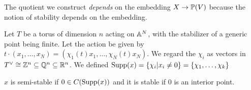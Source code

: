 
\begin{remark}
 The quotient we construct \emph{depends} on the embedding $X\to \PP(V)$ because the notion of stability depends on the embedding.
\end{remark}

\begin{proposition}
 Let $T$ be a torus of dimension $n$ acting on $\AA^N$, with the stabilizer of a generic point being finite. Let the action be given by $t\cdot (x_1,\dots, x_N)=(\chi_1(t)x_1,\dots, \chi_N(t)x_N)$. We regard the $\chi_i$ as vectors in $T^\vee\cong \ZZ^n\subseteq \QQ^n\subseteq \RR^n$. We defined $\supp(x)=\{\chi_i|x_i\neq 0\}=\{\chi_1,\dots, \chi_k\}$
 
 $x$ is semi-stable if $0\in C(\supp(x))$ and it is stable if $0$ is an interior point.
\end{proposition}

